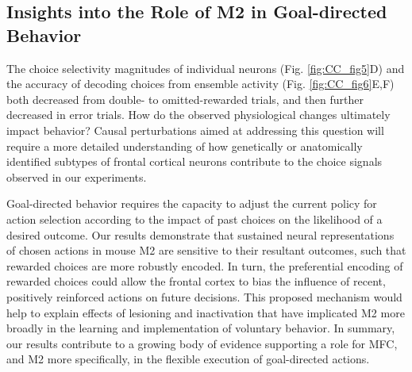 \subsection{Insights into the Role of M2 in Goal-directed Behavior}
The choice selectivity magnitudes of individual neurons (Fig. \ref{fig:CC_fig5}D) and the accuracy of decoding choices from ensemble activity (Fig. \ref{fig:CC_fig6}E,F) both decreased from double- to omitted-rewarded trials, and then further decreased in error trials. How do the observed physiological changes ultimately impact behavior? Causal perturbations aimed at addressing this question will require a more detailed understanding of how genetically \citep{kvitsiani2013distinct, pinto2015cell, kamigaki2017delay} or anatomically identified subtypes of frontal cortical neurons \citep{li2015motor, chen2017map, otis2017prefrontal} contribute to the choice signals observed in our experiments.

Goal-directed behavior requires the capacity to adjust the current policy for action selection according to the impact of past choices on the likelihood of a desired outcome. Our results demonstrate that sustained neural representations of chosen actions in mouse M2 are sensitive to their resultant outcomes, such that rewarded choices are more robustly encoded. In turn, the preferential encoding of rewarded choices could allow the frontal cortex to bias the influence of recent, positively reinforced actions on future decisions. This proposed mechanism would help to explain effects of lesioning \citep{passingham1988premotor, gremel2013premotor} and inactivation \citep{siniscalchi2016fast, makino2017transformation} that have implicated M2 more broadly in the learning and implementation of voluntary behavior. In summary, our results contribute to a growing body of evidence supporting a role for MFC, and M2 more specifically, in the flexible execution of goal-directed actions.